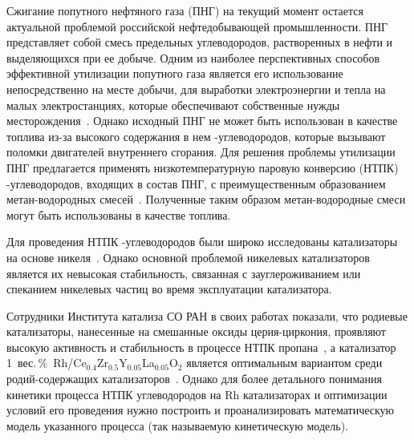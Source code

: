 \documentclass{cmi}
\begin{document}
Сжигание попутного нефтяного газа (ПНГ) на текущий момент остается актуальной проблемой российской нефтедобывающей промышленности. 
ПНГ представляет собой смесь предельных углеводородов, растворенных в нефти и выделяющихся при ее добыче. 
Одним из наиболее перспективных способов эффективной утилизации попутного газа является его использование непосредственно на месте добычи, для выработки электроэнергии и тепла на малых электростанциях, которые обеспечивают собственные нужды месторождения~. Однако исходный ПНГ не может быть использован в качестве топлива из-за высокого содержания в нем -углеводородов, которые вызывают поломки двигателей внутреннего сгорания. Для решения проблемы утилизации ПНГ предлагается применять низкотемпературную паровую конверсию (НТПК) -углеводородов, входящих в состав ПНГ, с преимущественным образованием метан-водородных смесей~. Полученные таким образом метан-водородные смеси могут быть использованы в качестве топлива.

Для проведения НТПК -углеводородов были широко исследованы катализаторы на основе никеля~. Однако основной проблемой никелевых катализаторов является их невысокая стабильность, связанная с зауглероживанием или спеканием никелевых частиц во время эксплуатации катализатора.

Сотрудники Института катализа СО РАН в своих работах показали, что родиевые катализаторы, нанесенные на смешанные оксиды церия-циркония, проявляют высокую активность и стабильность в процессе НТПК пропана~, а катализатор 1~вес.\,\%~Rh/Ce$_{0.4}$Zr$_{0.5}$Y$_{0.05}$La$_{0.05}$O$_2$ является оптимальным вариантом среди родий-содержащих катализаторов~.
Однако для более детального понимания кинетики процесса НТПК углеводородов на Rh катализаторах и оптимизации условий его проведения нужно построить и проанализировать математическую модель указанного процесса (так называемую кинетическую модель).

\end{document}
